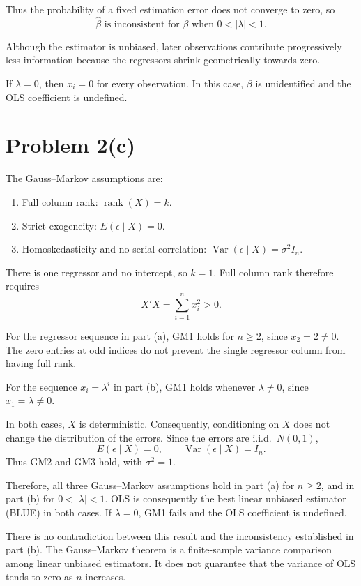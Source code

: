 \documentclass[11pt]{article}
\begin{document}
Thus the probability of a fixed estimation error
does not converge to zero, so
\[
\boxed{
\widehat{\beta}\text{ is inconsistent for }\beta
\text{ when }0<|\lambda|<1.
}
\]

Although the estimator is unbiased, later
observations contribute progressively less
information because the regressors shrink
geometrically towards zero.

If $\lambda=0$, then $x_i=0$ for every observation.
In this case, $\beta$ is unidentified and the
OLS coefficient is undefined.
\section*{Problem 2(c)}

The Gauss--Markov assumptions are:
\begin{enumerate}
    \item[(GM1)] Full column rank:
    $\operatorname{rank}(X)=k$.
    \item[(GM2)] Strict exogeneity:
    $E(\epsilon\mid X)=0$.
    \item[(GM3)] Homoskedasticity and no serial
    correlation:
    $\operatorname{Var}(\epsilon\mid X)=\sigma^2I_n$.
\end{enumerate}

There is one regressor and no intercept, so
$k=1$. Full column rank therefore requires
\[
X'X=\sum_{i=1}^n x_i^2>0.
\]

For the regressor sequence in part (a), GM1 holds
for $n\geq2$, since $x_2=2\neq0$.
The zero entries at odd indices do not prevent
the single regressor column from having full rank.

For the sequence $x_i=\lambda^i$ in part (b),
GM1 holds whenever $\lambda\neq0$, since
$x_1=\lambda\neq0$.

In both cases, $X$ is deterministic.
Consequently, conditioning on $X$ does not change
the distribution of the errors. Since the errors
are i.i.d.\ $N(0,1)$,
\[
E(\epsilon\mid X)=0,
\qquad
\operatorname{Var}(\epsilon\mid X)=I_n.
\]
Thus GM2 and GM3 hold, with $\sigma^2=1$.

Therefore, all three Gauss--Markov assumptions
hold in part (a) for $n\geq2$, and in part (b)
for $0<|\lambda|<1$. OLS is consequently the
best linear unbiased estimator (BLUE) in both cases.
If $\lambda=0$, GM1 fails and the OLS coefficient
is undefined.

There is no contradiction between this result
and the inconsistency established in part (b).
The Gauss--Markov theorem is a finite-sample
variance comparison among linear unbiased
estimators. It does not guarantee that the
variance of OLS tends to zero as $n$ increases.
\end{document}
